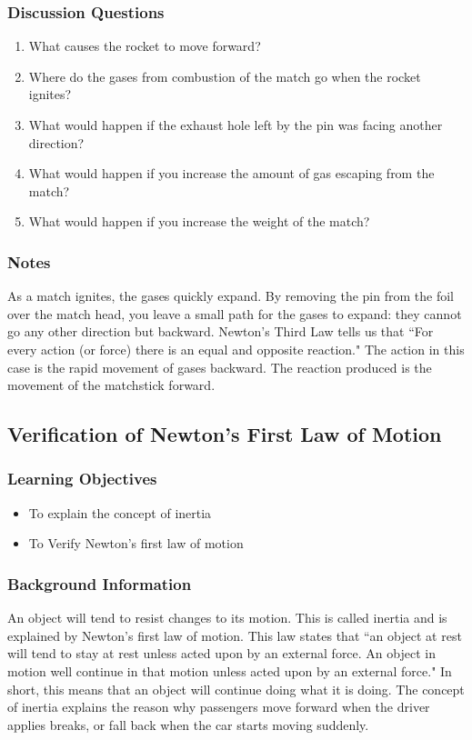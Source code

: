 \subsubsection*{Discussion Questions}
\begin{enumerate}
\item{What causes the rocket to move forward?}
\item{Where do the gases from combustion of the match go when the rocket ignites?}
\item{What would happen if the exhaust hole left by the pin was facing another direction?}
\item{What would happen if you increase the amount of gas escaping from the match?}
\item{What would happen if you increase the weight of the match?}
\end{enumerate}

\subsubsection*{Notes}
As a match ignites, the gases quickly expand. By removing the pin from the foil over the match head, you leave a small path for the gases to expand: they cannot go any other direction but backward. Newton's Third Law tells us that ``For every action (or force) there is an equal and opposite reaction." The action in this case is the rapid movement of gases backward. The reaction produced is the movement of the matchstick forward.

\subsection{Verification of Newton's First Law of Motion}

\subsubsection*{Learning Objectives}
\begin{itemize}
\item{To explain the concept of inertia} 
\item{To Verify Newton's first law of motion} 
\end{itemize}

\subsubsection*{Background Information}
An object will tend to resist changes to its motion. This is called inertia and is explained by Newton's first law of motion. This law states that ``an object at rest will tend to stay at rest unless acted upon by an external force. An object in motion well continue in that motion unless acted upon by an external force."  In short, this means that an object will continue doing what it is doing. The concept of inertia explains the reason why passengers move forward when the driver applies breaks, or fall back when the car starts moving suddenly.

